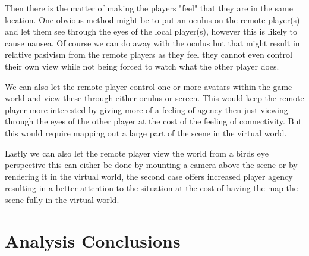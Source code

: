 		Then there is the matter of making the players "feel" that they are in the 
		same location. One obvious method might be to put an oculus on the remote player(s) and let 
		them see through the eyes of the local player(s), however this is likely to cause nausea. 
		Of course we can do away with the oculus but that might result in relative pasivism from 
		the remote players as they feel they cannot 
		even control their own view while not being forced to watch what the other player does. 

		We can also let the remote player control one or more avatars within the game world
		and view these through either oculus or screen. This would keep the remote player
		more interested by giving more of a feeling of agency then just viewing through the eyes 
		of the other player at the cost of the feeling of connectivity. But this would require 
		mapping out a large part of the scene in the virtual world. 
		
		Lastly we can also let the remote player view the world from a birds eye perspective 
		this can either be done by mounting a camera above the scene or by rendering it in 
		the virtual world, the second case offers increased player agency resulting in 
		a better attention to the situation at the cost of having the map the scene fully 
		in the virtual world. 
		
		
	\section{Analysis Conclusions} \label{sec:analysisconclusion}
		
